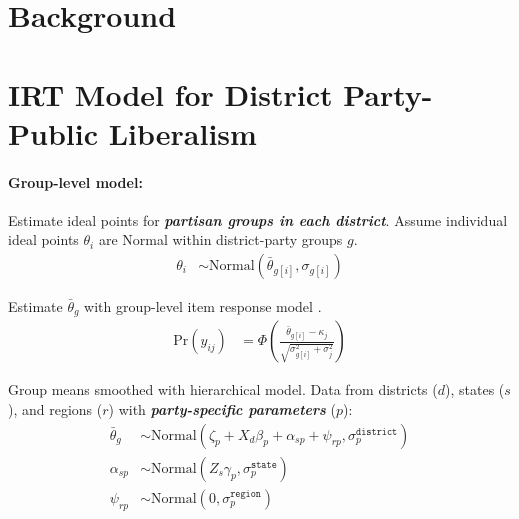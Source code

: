 \documentclass[a0]{a0poster}
\begin{document}
\vspace{2cm} %
%
%
%
%
%
%
%
%
\begin{multicols*}{3}

\LARGE
\raggedright

\raggedcolumns

\section*{Background}

\columnbreak



\section*{IRT Model for District Party-Public Liberalism}

\paragraph{Group-level model:}
Estimate ideal points for \textbf{\emph{partisan groups in each district}}. Assume individual ideal points $\theta_{i}$ are Normal within district-party groups $g$.
\begin{align}
  \theta_{i} &\sim \mathrm{Normal}\left( \bar{\theta}_{g[i]} , \sigma_{g[i]} \right)
\end{align}

Estimate $\bar{\theta}_{g}$ with group-level item response model \parencite{caughey2015dynamic}.
\begin{align}
  \mathrm{Pr}\left( y_{\mathit{ij}} \right) &= 
    \Phi\left( 
      \frac{
        \bar{\theta}_{g[i]} - \kappa_{j}
      }{
        \sqrt{ \sigma_{g[i]}^{2} + \sigma^{2}_{j} }
      } 
    \right)
\end{align}

Group means smoothed with hierarchical model. Data from districts ($d$), states ($s$), and regions ($r$) with \emph{\textbf{party-specific parameters}} ($p$):
\begin{align}
  \bar{\theta}_{g} &\sim \mathrm{Normal}\left(\zeta_{p} + X_{d}\beta_{p} + \alpha_{sp} + \psi_{rp}, \sigma^{\texttt{district}}_{p} \right) \\[12pt]
  \alpha_{sp} &\sim \mathrm{Normal}\left( Z_{s}\gamma_{p}, \sigma_{p}^{\texttt{state}} \right) \\[12pt]
  \psi_{rp} &\sim \mathrm{Normal}\left(0, \sigma_{p}^{\texttt{region}}\right)
\end{align}



\end{multicols*}
\end{document}
